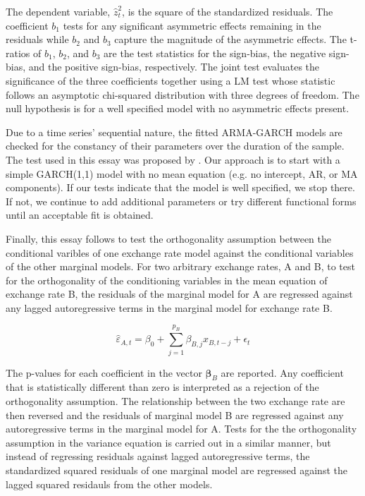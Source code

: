 \documentclass[12pt]{article}
\begin{document}
The dependent variable, $\hat{z}_{t}^{2}$, is the square of the standardized residuals. The coefficient $b_{1}$ tests for any significant asymmetric effects remaining in the residuals while $b_{2}$ and $b_{3}$ capture the magnitude of the asymmetric effects. The t-ratios of $b_{1}$, $b_{2}$, and $b_{3}$ are the test statistics for the sign-bias, the negative sign-bias, and the positive sign-bias, respectively. The joint test evaluates the significance of the three coefficients together using a LM test whose statistic follows an asymptotic chi-squared distribution with three degrees of freedom. The null hypothesis is for a well specified model with no asymmetric effects present.

Due to a time series' sequential nature, the fitted ARMA-GARCH models are checked for the constancy of their parameters over the duration of the sample. The test used in this essay was proposed by \cite{NYBLOM_1989}. Our approach is to start with a simple GARCH(1,1) model with no mean equation (e.g. no intercept, AR, or MA components). If our tests indicate that the model is well specified, we stop there. If not, we continue to add additional parameters or try different functional forms until an acceptable fit is obtained.

Finally, this essay follows \cite{Patton_2006} to test the orthogonality assumption between the conditional varibles of one exchange rate model against the conditional variables of the other marginal models. For two arbitrary exchange rates, A and B, to test for the orthogonality of the conditioning variables in the mean equation of exchange rate B, the residuals of the marginal model for A are regressed against any lagged autoregressive terms in the marginal model for exchange rate B.

\begin{equation} \label{eq:mean_orthogonality_assumption}
	\hat{\varepsilon}_{A, t} = \beta_{0} + \sum_{j=1}^{p_{B}}\beta_{B,j} x_{B, t-j} + \epsilon_{t}
\end{equation}

The p-values for each coefficient in the vector $\boldsymbol{\beta}_{B}$ are reported. Any coefficient that is statistically different than zero is interpreted as a rejection of the orthogonality assumption. The relationship between the two exchange rate are then reversed and the residuals of marginal model B are regressed against any autoregressive terms in the marginal model for A. Tests for the the orthogonality assumption in the variance equation is carried out in a similar manner, but instead of regressing residuals against lagged autoregressive terms, the standardized squared residuals of one marginal model are regressed against the lagged squared residauls from the other models.
\end{document}
